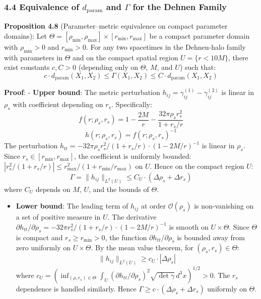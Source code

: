 \documentclass[
]{article}
\providecommand{\tightlist}{%
  \setlength{\itemsep}{0pt}\setlength{\parskip}{0pt}}
\begin{document}
\subsubsection{\texorpdfstring{4.4 Equivalence of \(d_{\text{param}}\)
and \(\Gamma\) for the Dehnen
Family}{4.4 Equivalence of d\_\{\textbackslash text\{param\}\} and \textbackslash Gamma for the Dehnen Family}}\label{equivalence-of-d_textparam-and-gamma-for-the-dehnen-family}

\textbf{Proposition 4.8} (Parameter--metric equivalence on compact
parameter domains): Let
\(\Theta = [\rho_{\min}, \rho_{\max}] \times [r_{\min}, r_{\max}]\) be a
compact parameter domain with \(\rho_{\min} > 0\) and \(r_{\min} > 0\).
For any two spacetimes in the Dehnen-halo family with parameters in
\(\Theta\) and on the compact spatial region \(U = \{r < 10M\}\), there
exist constants \(c, C > 0\) (depending only on \(\Theta\), \(M\), and
\(U\)) such that:
\[c \cdot d_{\text{param}}(X_1, X_2) \leq \Gamma(X_1, X_2) \leq C \cdot d_{\text{param}}(X_1, X_2)\]

\textbf{Proof}: - \textbf{Upper bound}: The metric perturbation
\(h_{ij} = \gamma^{(1)}_{ij} - \gamma^{(2)}_{ij}\) is linear in
\(\rho_s\) with coefficient depending on \(r_s\). Specifically:
\[f(r; \rho_s, r_s) = 1 - \frac{2M}{r} - \frac{32\pi\rho_s r_s^2}{1 + r_s/r}\]
\[h(r; \rho_s, r_s) = f(r; \rho_s, r_s)^{-1}\] The perturbation
\(h_{tt} = -32\pi\rho_s r_s^2/(1+r_s/r) \cdot (1-2M/r)^{-1}\) is linear
in \(\rho_s\). Since \(r_s \in [r_{\min}, r_{\max}]\), the coefficient
is uniformly bounded:
\(|r_s^2/(1+r_s/r)| \leq r_{\max}^2/(1+r_{\min}/r_{\max})\) on \(U\).
Hence on the compact region \(U\):
\[\Gamma = \|h_{ij}\|_{L^2(U)} \leq C_U \cdot (\Delta\rho_s + \Delta r_s)\]
where \(C_U\) depends on \(M\), \(U\), and the bounds of \(\Theta\).

\begin{itemize}
\tightlist
\item
  \textbf{Lower bound}: The leading term of \(h_{ij}\) at order
  \(\mathcal{O}(\rho_s)\) is non-vanishing on a set of positive measure
  in \(U\). The derivative
  \(\partial h_{tt}/\partial\rho_s = -32\pi r_s^2/(1+r_s/r) \cdot (1-2M/r)^{-1}\)
  is smooth on \(U \times \Theta\). Since \(\Theta\) is compact and
  \(r_s \geq r_{\min} > 0\), the function
  \(\partial h_{tt}/\partial\rho_s\) is bounded away from zero uniformly
  on \(U \times \Theta\). By the mean value theorem, for
  \((\rho_s, r_s) \in \Theta\):
  \[\|h_{ij}\|_{L^2(U)} \geq c_U \cdot |\Delta\rho_s|\] where
  \(c_U = \left(\inf_{(\rho,r_s)\in\Theta} \int_U (\partial h_{tt}/\partial\rho_s)^2 \sqrt{\det\gamma}\, d^3x\right)^{1/2} > 0\).
  The \(r_s\) dependence is handled similarly. Hence
  \(\Gamma \geq c \cdot (\Delta\rho_s + \Delta r_s)\) uniformly on
  \(\Theta\).
\end{itemize}
\end{document}
